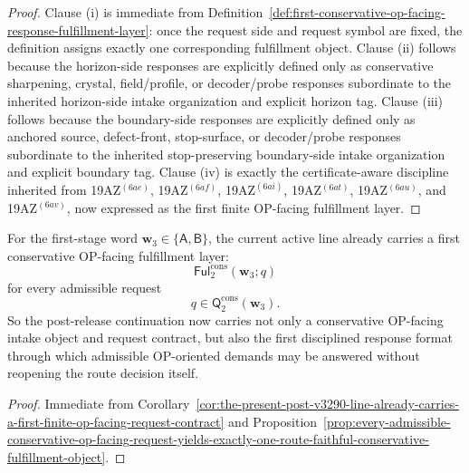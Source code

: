 \begin{proof}
Clause (i) is immediate from Definition~\ref{def:first-conservative-op-facing-response-fulfillment-layer}: once the request side and request symbol are fixed, the definition assigns exactly one corresponding fulfillment object. Clause (ii) follows because the horizon-side responses are explicitly defined only as conservative sharpening, crystal, field/profile, or decoder/probe responses subordinate to the inherited horizon-side intake organization and explicit horizon tag. Clause (iii) follows because the boundary-side responses are explicitly defined only as anchored source, defect-front, stop-surface, or decoder/probe responses subordinate to the inherited stop-preserving boundary-side intake organization and explicit boundary tag. Clause (iv) is exactly the certificate-aware discipline inherited from 19AZ$^{(6ae)}$, 19AZ$^{(6af)}$, 19AZ$^{(6ai)}$, 19AZ$^{(6at)}$, 19AZ$^{(6au)}$, and 19AZ$^{(6av)}$, now expressed as the first finite OP-facing fulfillment layer.
\end{proof}

\begin{corollary}
\label{cor:the-present-post-v3290-line-already-carries-a-first-op-facing-fulfillment-layer}
For the first-stage word \(\mathbf w_3\in\{\mathsf A,\mathsf B\}\), the current active line already carries a first conservative OP-facing fulfillment layer:
\[
  \mathsf{Ful}^{\mathrm{cons}}_{2}(\mathbf w_3;q)
\]
for every admissible request
\[
  q\in\mathsf{Q}^{\mathrm{cons}}_{2}(\mathbf w_3).
\]
So the post-release continuation now carries not only a conservative OP-facing intake object and request contract, but also the first disciplined response format through which admissible OP-oriented demands may be answered without reopening the route decision itself.
\end{corollary}

\begin{proof}
Immediate from Corollary~\ref{cor:the-present-post-v3290-line-already-carries-a-first-finite-op-facing-request-contract} and Proposition~\ref{prop:every-admissible-conservative-op-facing-request-yields-exactly-one-route-faithful-conservative-fulfillment-object}.
\end{proof}

